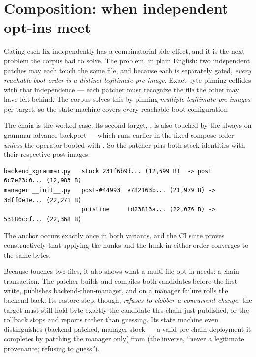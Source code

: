 \section{Composition: when independent opt-ins meet}
\label{sec:patches-compose}

Gating each fix independently has a combinatorial side effect, and it is the
next problem the corpus had to solve. The problem, in plain English: two
independent patches may each touch the
same file, and because each is separately gated, \emph{every reachable boot
order is a distinct legitimate pre-image}. Exact byte pinning collides with
that independence --- each patcher must recognize the file the other may
have left behind. The corpus solves this by pinning \emph{multiple
legitimate pre-images} per target, so the state machine covers every
reachable boot configuration.

The  chain is the worked case. Its second target,
, is also touched by the
always-on  grammar-advance backport --- which runs earlier in
the fixed compose order \emph{unless} the operator booted with
. So the patcher pins both stock
identities with their respective post-images:

\begin{lstlisting}
backend_xgrammar.py   stock 231f6b9d... (12,699 B)  -> post 6c7e23c0... (12,983 B)
manager __init__.py   post-#44993  e782163b... (21,979 B) -> 3dff0e1e... (22,271 B)
                      pristine     fd23813a... (22,076 B) -> 53186ccf... (22,368 B)
\end{lstlisting}

The  anchor occurs exactly once in both variants, and the CI
suite proves constructively that applying the  hunks and the
 hunk in either order converges to the same bytes.

Because  touches two files, it also shows what a multi-file
opt-in needs: a chain transaction. The patcher builds and compiles both
candidates before the first write, publishes backend-then-manager, and on a
manager failure rolls the backend back. Its restore step, though, \emph{refuses
to clobber a concurrent change}: the target must still hold byte-exactly the
candidate this chain just published, or the rollback stops and reports rather
than guessing. Its state machine even distinguishes 
(backend patched, manager stock --- a valid pre-chain deployment it completes
by patching the manager only) from  (the inverse,
``never a legitimate provenance; refusing to guess'').

